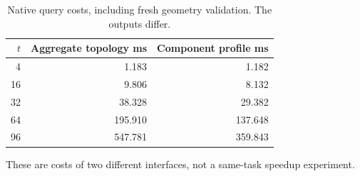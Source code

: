 \begin{table}[htbp]
\centering
\small
\begin{tabular}{rrr}
\toprule
$t$ & Aggregate topology ms & Component profile ms \\
\midrule
4 & 1.183 & 1.182 \\
16 & 9.806 & 8.132 \\
32 & 38.328 & 29.382 \\
64 & 195.910 & 137.648 \\
96 & 547.781 & 359.843 \\
\bottomrule
\end{tabular}
\caption{Native query costs, including fresh geometry validation. The outputs differ.}
\label{tab:profile-costs}
\par\smallskip\footnotesize These are costs of two different interfaces, not a same-task speedup experiment.
\end{table}
